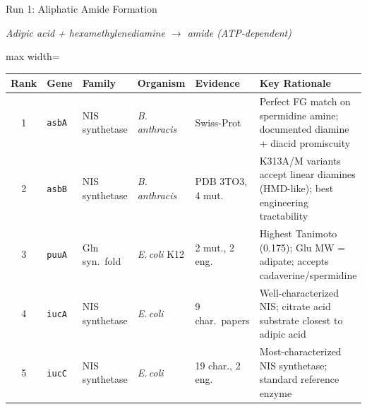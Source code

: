 \documentclass[aspectratio=169, 11pt]{beamer}
\begin{document}
\begin{frame}{Run 1: Aliphatic Amide Formation}
\vspace{-8pt}
\begin{center}
\scriptsize\color{darkgray} \textit{Adipic acid + hexamethylenediamine $\rightarrow$ amide (ATP-dependent)}
\end{center}
\vspace{-4pt}

{\scriptsize
\begin{adjustbox}{max width=\textwidth}
\begin{tabular}{@{}c l l l l p{5.5cm}@{}}
\toprule
\textbf{Rank} & \textbf{Gene} & \textbf{Family} & \textbf{Organism} & \textbf{Evidence} & \textbf{Key Rationale}\\
\midrule
1 & \texttt{asbA} & NIS synthetase & \textit{B.\,anthracis} & Swiss-Prot &
Perfect FG match on spermidine amine; documented diamine + diacid promiscuity\\
2 & \texttt{asbB} & NIS synthetase & \textit{B.\,anthracis} & PDB 3TO3, 4 mut. &
K313A/M variants accept linear diamines (HMD-like); best engineering tractability\\
3 & \texttt{puuA} & Gln syn.\ fold & \textit{E.\,coli} K12 & 2 mut., 2 eng. &
Highest Tanimoto (0.175); Glu MW = adipate; accepts cadaverine/spermidine\\
4 & \texttt{iucA} & NIS synthetase & \textit{E.\,coli} & 9 char.\ papers &
Well-characterized NIS; citrate acid substrate closest to adipic acid\\
5 & \texttt{iucC} & NIS synthetase & \textit{E.\,coli} & 19 char., 2 eng. &
Most-characterized NIS synthetase; standard reference enzyme\\
\bottomrule
\end{tabular}
\end{adjustbox}
}


\end{frame}
\end{document}
